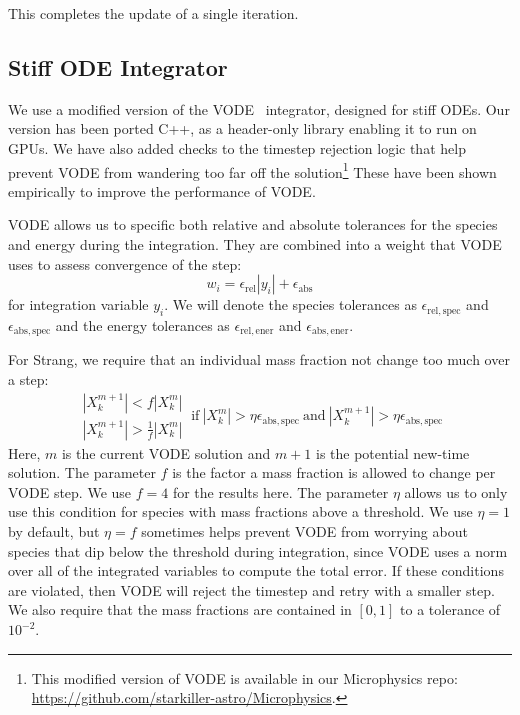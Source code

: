 \documentclass{aastex63}
\newcommand{\atolspec}{{\epsilon_\mathrm{abs,spec}}}
\newcommand{\rtolspec}{{\epsilon_\mathrm{rel,spec}}}
\newcommand{\atolener}{{\epsilon_\mathrm{abs,ener}}}
\newcommand{\rtolener}{{\epsilon_\mathrm{rel,ener}}}
\begin{document}
This completes the update of a single iteration.

\subsection{Stiff ODE Integrator}

We use a modified version of the VODE~\citep{vode} integrator,
designed for stiff ODEs.  Our version has been ported C++, as a
header-only library enabling it to run on GPUs.  We have also added
checks to the timestep rejection logic that help prevent VODE from
wandering too far off the solution\footnote{This modified version of
VODE is available in our Microphysics repo:
\url{https://github.com/starkiller-astro/Microphysics}.}  These have
been shown empirically to improve the performance of VODE.

VODE allows us to specific both relative and absolute tolerances
for the species and energy during the integration.  They are combined
into a weight that VODE uses to assess convergence of the step:
\begin{equation}
w_i = \epsilon_\mathrm{rel} |y_i| + \epsilon_\mathrm{abs}
\end{equation}
for integration variable $y_i$.  We will denote the species tolerances
as $\rtolspec$ and $\atolspec$ and the energy tolerances as $\rtolener$ and
$\atolener$.

For Strang, we require that
an individual mass fraction not change too much over a step:
\begin{equation}
\label{eq:vode_species_reject}
\begin{array}{c}|X_k^{m+1}| < f |X_k^m| \\ |X_k^{m+1}| > \frac{1}{f} |X_k^m| \end{array} ~  \mbox{if}~ |X_k^m| > \eta \atolspec ~\mbox{and}~ |X_k^{m+1}| > \eta \atolspec 
\end{equation}
Here, $m$ is the current VODE solution and $m+1$ is the potential
new-time solution.  The parameter $f$ is the factor a mass fraction is
allowed to change per VODE step.  We use $f = 4$ for the results here.
The parameter $\eta$ allows us to only use this condition for species
with mass fractions above a threshold.  We use $\eta = 1$ by default,
but $\eta = f$ sometimes helps prevent VODE from worrying about
species that dip below the threshold during integration, since VODE
uses a norm over all of the integrated variables to compute the total
error.  If these conditions are violated, then VODE will reject the
timestep and retry with a smaller step.  We also require that the mass
fractions are contained in $[0, 1]$ to a tolerance of $10^{-2}$.
\end{document}
